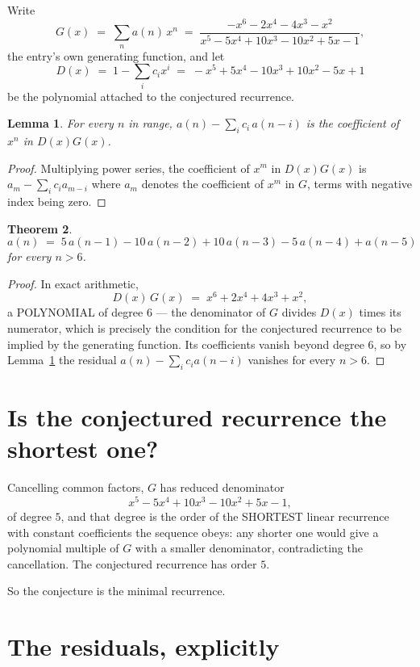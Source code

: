 \documentclass[11pt,a4paper]{article}
\theoremstyle{plain}
\newtheorem{theorem}{Theorem}
\newtheorem{lemma}[theorem]{Lemma}
\theoremstyle{definition}
\begin{document}
Write
\[
G(x)\;=\;\sum_{n}a(n)\,x^{n}\;=\;\frac{- x^{6} - 2 x^{4} - 4 x^{3} - x^{2}}{x^{5} - 5 x^{4} + 10 x^{3} - 10 x^{2} + 5 x - 1},
\]
the entry's own generating function, and let
\[
D(x)\;=\;1-\sum_i c_i x^{i}\;=\;- x^{5} + 5 x^{4} - 10 x^{3} + 10 x^{2} - 5 x + 1
\]
be the polynomial attached to the conjectured recurrence.

\begin{lemma}\label{lem:key}
For every $n$ in range, $a(n)-\sum_i c_i\,a(n-i)$ is the coefficient of $x^{n}$ in
$D(x)G(x)$.
\end{lemma}

\begin{proof}
Multiplying power series, the coefficient of $x^{m}$ in $D(x)G(x)$ is
$a_m-\sum_i c_i a_{m-i}$ where $a_m$ denotes the coefficient of $x^{m}$ in $G$, terms with
negative index being zero.
\end{proof}

\begin{theorem}
\[
a(n)\;=\;5\,a(n-1) - 10\,a(n-2) + 10\,a(n-3) - 5\,a(n-4) + a(n-5)
\]
for every $n>6$.
\end{theorem}

\begin{proof}
In exact arithmetic,
\[
D(x)\,G(x)\;=\;x^{6} + 2 x^{4} + 4 x^{3} + x^{2},
\]
a POLYNOMIAL of degree $6$ --- the denominator of $G$ divides $D(x)$ times its numerator,
which is precisely the condition for the conjectured recurrence to be implied by the
generating function. Its coefficients vanish beyond degree $6$, so by
Lemma~\ref{lem:key} the residual $a(n)-\sum_ic_ia(n-i)$ vanishes for every
$n>6$.
\end{proof}

\section{Is the conjectured recurrence the shortest one?}

Cancelling common factors, $G$ has reduced denominator
\[
x^{5} - 5 x^{4} + 10 x^{3} - 10 x^{2} + 5 x - 1,
\]
of degree $5$, and that degree is the order of the SHORTEST linear recurrence with
constant coefficients the sequence obeys: any shorter one would give a polynomial multiple of
$G$ with a smaller denominator, contradicting the cancellation. The conjectured recurrence has
order $5$.

So the conjecture is the minimal recurrence.

\section{The residuals, explicitly}
\end{document}
